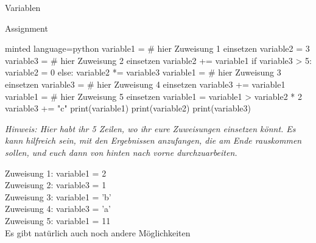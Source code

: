 \begin{task}[points=auto]{Variablen }
\begin{subtask*}[points=0]{Assignment}
        \begin{codeBlock}[]{minted language=python}
            variable1 = # hier Zuweisung 1 einsetzen
            variable2 = 3
            variable3 = # hier Zuweisung 2 einsetzen
            variable2 += variable1
            if variable3 > 5:
                variable2 = 0
            else:
                variable2 *= variable3
            variable1 = # hier Zuweisung 3 einsetzen
            variable3 = # hier Zuweisung 4 einsetzen
            variable3 += variable1
            variable1 = # hier Zuweisung 5 einsetzen
            variable1 = variable1 > variable2 * 2
            variable3 += "c"
            print(variable1)
            print(variable2)
            print(variable3)
        \end{codeBlock}

        \textit{Hinweis: Hier habt ihr 5 Zeilen, wo ihr eure Zuweisungen einsetzen könnt. Es kann hilfreich sein, mit den Ergebnissen anzufangen, die am Ende rauskommen sollen, und euch dann von hinten nach vorne durchzuarbeiten.}

        \begin{solution}
            Zuweisung 1: variable1 = 2 \\
            Zuweisung 2: variable3 = 1 \\
            Zuweisung 3: variable1 = 'b' \\
            Zuweisung 4: variable3 = 'a' \\
            Zuweisung 5: variable1 = 11 \\
            Es gibt natürlich auch noch andere Möglichkeiten
        \end{solution}
    \end{subtask*}
\end{task}
